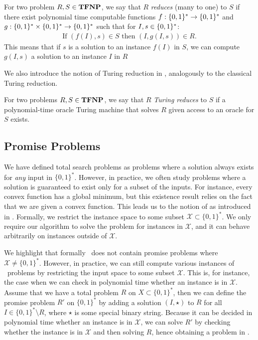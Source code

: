 \begin{definition}
    For two problem $R, S \in \textbf{TFNP}$, we say that $R$ \emph{reduces} (many to one) to $S$ if there exist polynomial time computable functions $f : \{0, 1\}^* \rightarrow \{0, 1\}^*$ and $g : \{0, 1\}^* \times \{0, 1\}^* \rightarrow \{0, 1\}^*$ such that for $I, s \in \{0, 1\}^*$:
    \begin{align*}
        \text{If } (f(I), s) \in S \text{ then } (I, g(I, s)) \in R.
    \end{align*}
    This means that if $s$ is a solution to an instance $f(I)$ in $S$, we can compute $g(I, s)$ a solution to an instance $I$ in $R$
\end{definition}

We also introduce the notion of Turing reduction in \TFNP, analogously to the classical Turing reduction.

\begin{definition}
    For two problems $R, S \in \textbf{TFNP}$, we say that $R$ \emph{Turing reduces} to $S$ if a polynomial-time oracle Turing machine that solves $R$ given access to an oracle for $S$ exists.
\end{definition}

\subsection{Promise Problems}

We have defined total search problems as problems where a solution always exists for \emph{any} input in $\{0, 1\}^*$. However, in practice, we often study problems where a solution is guaranteed to exist only for a subset of the inputs. For instance, every convex function has a global minimum, but this existence result relies on the fact that we are given a convex function. This leads us to the notion of  as introduced in . Formally, we restrict the instance space to some subset $\mathcal{X} \subset \{0, 1\}^*$. We only require our algorithm to solve the problem for instances in $\mathcal{X}$, and it can behave arbitrarily on instances outside of $\mathcal{X}$.

We highlight that formally \TFNP\ does not contain promise problems where $\mathcal{X} \neq \{0, 1\}^*$. However, in practice, we can still compute various instances of \TFNP\ problems by restricting the input space to some subset $\mathcal{X}$. This is, for instance, the case when we can check in polynomial time whether an instance is in $\mathcal{X}$. Assume that we have a total problem $R$ on $X \subset \{0, 1\}^*$, then we can define the promise problem $R'$ on $\{0, 1\}^*$ by adding a solution $(I, \star)$ to $R$ for all $I \in \{0, 1\}^* \setminus R$, where $\star$ is some special binary string. Because it can be decided in polynomial time whether an instance is in $\mathcal{X}$, we can solve $R'$ by checking whether the instance is in $\mathcal{X}$ and then solving $R$, hence obtaining a problem in \TFNP.

